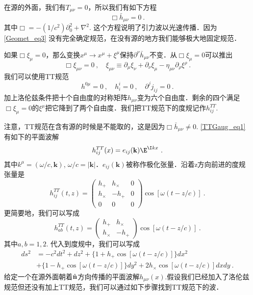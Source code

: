 
\begin{issues}
\issueNeedCite
\issueMissDepend
\end{issues}

在源的外面，我们有$T_{\mu\nu} = 0$，所以我们有如下方程
\begin{equation}\label{TTGaug_eq1}
\Box \bar h_{\mu\nu} = 0 ~.
\end{equation}
其中$\Box = - (1/c^2) \partial_0^2 +\nabla^2$. 这个方程说明了引力波以光速传播．因为\autoref{Geomet_eq3} 没有完全确定规范，在没有源的地方我们能够极大地固定规范．

如果$\Box \xi_\mu = 0$，那么变换$x^\mu \rightarrow x^\mu+\xi^\mu$保持$\partial^\nu \bar h_{\mu\nu}$不变．从$\Box \xi_\mu = 0$可以推出
\begin{equation}
\Box \xi_{\mu\nu} = 0~, \quad \xi_{\mu\nu} \equiv \partial_{\mu} \xi_\nu +\partial_\nu \xi_\mu - \eta_{\mu\nu} \partial_\rho\xi^\rho~. 
\end{equation}
我们可以使用TT规范
\begin{equation}
h^{0\mu} = 0~, \quad h^i_i = 0~, \quad \partial^j j_{ij} = 0~.
\end{equation}
加上洛伦兹条件把十个自由度的对称矩阵$h_{\mu\nu}$变为六个自由度．剩余的四个满足$\Box \xi_\mu = 0$的$\xi^\mu$把它降到了两个自由度．我们把TT规范下的度规记作$h_{ij}^{TT}$. 

注意，TT规范在含有源的时候是不能取的，这是因为$\Box \bar h_{\mu\nu} \neq 0$. \autoref{TTGaug_eq1} 有如下的平面波解
\begin{equation}
h_{ij}^{TT} (x) = e_{ij} (\mathbf k) \E^{\I kx} ~.  
\end{equation}
其中$k^\mu = (\omega/c,\mathbf k)$, $\omega/c = |\mathbf k|$．$e_{ij}(\mathbf k)$被称作极化张量．沿着z方向前进的度规张量是
\begin{equation}
h_{ij}^{TT} (t,z) = 
\begin{pmatrix}
h_+ & h_\times & 0 \\
h_\times & - h_+ & 0 \\
0 & 0 & 0
\end{pmatrix} \cos [\omega (t - z/c)]~. 
\end{equation}
更简要地，我们可以写成
\begin{equation}\label{TTGaug_eq2}
h_{ab}^{TT} (t,z) = 
\begin{pmatrix}
h_+ & h_\times   \\
h_\times & - h_+   
\end{pmatrix} \cos [\omega (t - z/c)]~. 
\end{equation}
其中$a,b = 1,2$. 代入到度规中，我们可以写成
\begin{equation}
\begin{aligned}
ds^2 & = - c^2 dt^2 + dz^2 + \{ 1+ h_+ \cos [\omega(t-z/c)] \} dx^2 \\
& + \{ 1-h_+ \cos [\omega(t-z/c)] \} dy^2 + 2 h_\times \cos[\omega(t-z/c)] dx dy~.
\end{aligned}
\end{equation}
给定一个在源外面朝着$\hat{\bf{n}}$方向传播的平面波解$h_{\mu\nu}(x)$.假设我们已经加入了洛伦兹规范但还没有加上TT规范，我们可以通过如下步骤找到TT规范下的波．

